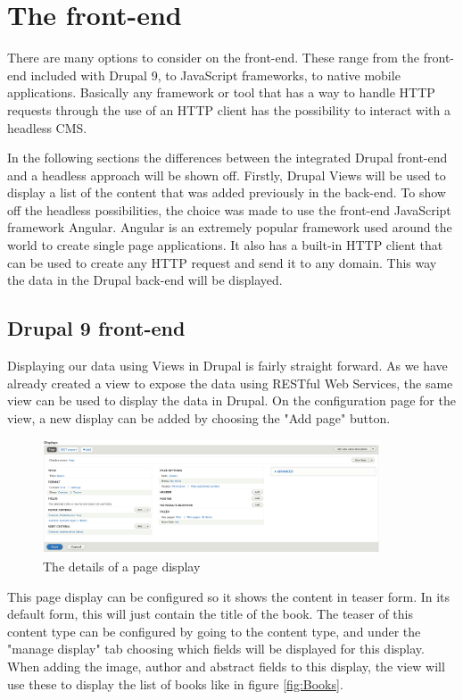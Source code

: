 \section{The front-end}

There are many options to consider on the front-end. These range from the front-end included with Drupal 9, to JavaScript frameworks, to native mobile applications. Basically any framework or tool that has a way to handle HTTP requests through the use of an HTTP client has the possibility to interact with a headless CMS. 

In the following sections the differences between the integrated Drupal front-end and a headless approach will be shown off. Firstly, Drupal Views will be used to display a list of the content that was added previously in the back-end. To show off the headless possibilities, the choice was made to use the front-end JavaScript framework Angular. Angular is an extremely popular framework used around the world to create single page applications. It also has a built-in HTTP client that can be used to create any HTTP request and send it to any domain. This way the data in the Drupal back-end will be displayed.

\subsection{Drupal 9 front-end}

Displaying our data using Views in Drupal is fairly straight forward. As we have already created a view to expose the data using RESTful Web Services, the same view can be used to display the data in Drupal. On the configuration page for the view, a new display can be added by choosing the "Add page" button. 

\begin{figure}[h]
	\centering
	\includegraphics[width=10cm]{./img/Page_View_Config.png}
	\caption[Details of a page display]{The details of a page display}
\end{figure}

This page display can be configured so it shows the content in teaser form. In its default form, this will just contain the title of the book. The teaser of this content type can be configured by going to the content type, and under the "manage display" tab choosing which fields will be displayed for this display. When adding the image, author and abstract fields to this display, the view will use these to display the list of books like in figure \ref{fig:Books}.


